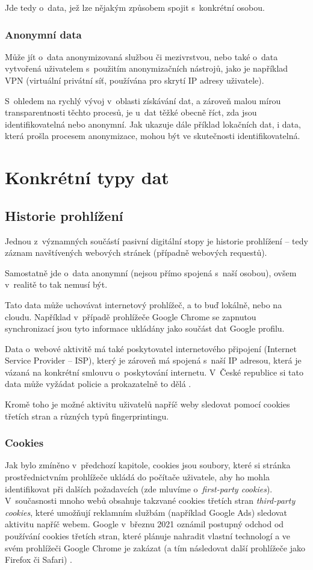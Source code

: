 Jde tedy o~data, jež lze nějakým způsobem spojit s~konkrétní osobou.

\subsubsection*{Anonymní data}

Může jít o~data anonymizovaná službou či mezivrstvou, nebo také o~data vytvořená uživatelem s~použitím anonymizačních nástrojů, jako je například VPN (virtuální privátní síť, používána pro skrytí IP adresy uživatele).

S~ohledem na rychlý vývoj v~oblasti získávání dat, a zároveň malou mírou transparentnosti těchto procesů, je u~dat těžké obecně říct, zda jsou identifikovatelná nebo anonymní. Jak ukazuje dále příklad lokačních dat, i data, která prošla procesem anonymizace, mohou být ve skutečnosti identifikovatelná.  

\section{Konkrétní typy dat}

\subsection{Historie prohlížení}
Jednou z~významných součástí pasivní digitální stopy je historie prohlížení -- tedy záznam navštívených webových stránek (případně webových requestů).


Samostatně jde o~data anonymní (nejsou přímo spojená s~naší osobou), ovšem v~realitě to tak nemusí být.

Tato data může uchovávat internetový prohlížeč, a to buď lokálně, nebo na cloudu. Například v~případě prohlížeče Google Chrome se zapnutou synchronizací jsou tyto informace ukládány jako součást dat Google profilu.

Data o~webové aktivitě má také poskytovatel internetového připojení (Internet Service Provider -- ISP), který je zároveň má spojená s~naší IP adresou, která je vázaná na konkrétní smlouvu o~poskytování internetu. V~České republice si tato data může vyžádat policie a prokazatelně to dělá \citep{policie-isp}.

Kromě toho je možné aktivitu uživatelů napříč weby sledovat pomocí cookies třetích stran a různých typů fingerprintingu.

\subsubsection*{Cookies}
Jak bylo zmíněno v~předchozí kapitole, cookies jsou soubory, které si stránka prostřednictvním prohlížeče ukládá do počítače uživatele, aby ho mohla identifikovat při dalších požadavcích (zde mluvíme o~\textit{first-party cookies}). V~současnosti mnoho webů obsahuje takzvané cookies třetích stran \textit{third-party cookies}, které umožňují reklamním službám (například Google Ads) sledovat aktivitu napříč webem.
Google v~březnu 2021 oznámil postupný odchod od používání cookies třetích stran, které plánuje nahradit vlastní technologí a ve svém prohlížeči Google Chrome je zakázat (a tím následovat další prohlížeče jako Firefox či Safari) \citep{google-privacy-announcement}.

